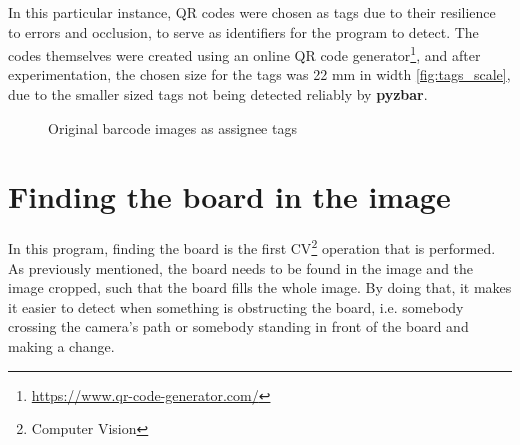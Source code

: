 \documentclass[12pt]{report}
\theoremstyle{definition}
\theoremstyle{remark}
\begin{document}
In this particular instance, QR codes were chosen as tags due to their resilience to errors and occlusion\cite{qr_wounded}, to serve as identifiers for the program to detect. The codes themselves were created using an online QR code generator\footnote{\url{https://www.qr-code-generator.com/}}, and after experimentation, the chosen size for the tags was 22 mm in width \ref{fig:tags_scale}, due to the smaller sized tags not being detected reliably by \textbf{pyzbar}.


\begin{figure}%
    \centering
    \qquad
    \qquad
    \caption{Original barcode images as assignee tags}%
    \label{fig:example}%
\end{figure}

\section{Finding the board in the image}
In this program, finding the board is the first CV\footnote{Computer Vision} operation that is performed. As previously mentioned, the board needs to be found in the image and the image cropped, such that the board fills the whole image. By doing that, it makes it easier to detect when something is obstructing the board, i.e. somebody crossing the camera's path or somebody standing in front of the board and making a change. 
\end{document}
